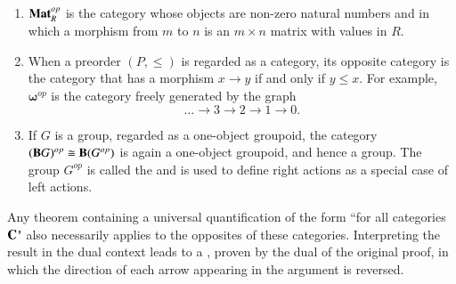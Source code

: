 \documentclass[12pt, a4paper, oneside, openright, titlepage]{book}
\begin{document}
\begin{eg}
    \leavevmode
    \begin{enumerate}
        \item $\normalfont\textbf{Mat}_R^{op}$ is the category whose objects are non-zero natural numbers and in which a morphism from $m$ to $n$ is an $m\times n$ matrix with values in $R$. 
        \item When a preorder $(P,\leq)$ is regarded as a category, its opposite category is the category that has a morphism $x\rightarrow y$ if and only if $y \leq x$. For example, $\mathbf{\omega}^{op}$ is the category freely generated by the graph \begin{equation*}
                \hdots \rightarrow 3\rightarrow 2\rightarrow 1\rightarrow 0.
        \end{equation*}
    \item If $G$ is a group, regarded as a one-object groupoid, the category $(\normalfont\textbf{B}G)^{op} \cong \normalfont\textbf{B}(G^{op})$ is again a one-object groupoid, and hence a group. The group $G^{op}$ is called the  and is used to define right actions as a special case of left actions.
    \end{enumerate}
\end{eg}

\begin{rmk}
    Any theorem containing a universal quantification of the form ``for all categories $\normalfont\textbf{C}$" also necessarily applies to the opposites of these categories. Interpreting the result in the dual context leads to a , proven by the dual of the original proof, in which the direction of each arrow appearing in the argument is reversed.
\end{rmk}
\end{document}
